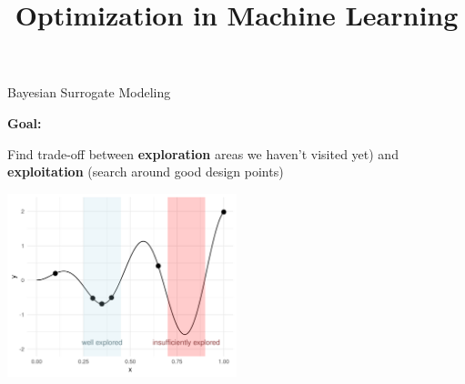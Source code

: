 \documentclass[11pt,compress,t,notes=noshow, xcolor=table]{beamer}
\title{Optimization in Machine Learning}
\date{}
\begin{document}

\begin{vbframe}{Bayesian Surrogate Modeling}

\textbf{Goal:}

Find trade-off between \textbf{exploration} areas we haven't visited yet) and \textbf{exploitation} (search around good design points)

\vspace{+.45cm}

\begin{center}
  \includegraphics[width = 0.5\textwidth]{figure_man/bayesian_loop_ee.png}
\end{center}

\framebreak 


\end{vbframe}
\end{document}
